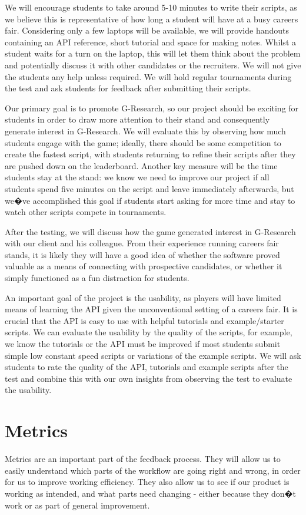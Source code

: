 We will encourage students to take around 5-10 minutes to write their scripts, as we believe this is representative of how long a student will have at a busy careers fair. Considering only a few laptops will be available, we will provide handouts containing an API reference, short tutorial and space for making notes. Whilst a student waits for a turn on the laptop, this will let them think about the problem and potentially discuss it with other candidates or the recruiters. We will not give the students any help unless required. We will hold regular tournaments during the test and ask students for feedback after submitting their scripts. 

Our primary goal is to promote G-Research, so our project should be exciting for students in order to draw more attention to their stand and consequently generate interest in G-Research. We will evaluate this by observing how much students engage with the game; ideally, there should be some competition to create the fastest script, with students returning to refine their scripts after they are pushed down on the leaderboard. Another key measure will be the time students stay at the stand: we know we need to improve our project if all students spend five minutes on the script and leave immediately afterwards, but we�ve accomplished this goal if students start asking for more time and stay to watch other scripts compete in tournaments.

After the testing, we will discuss how the game generated interest in G-Research with our client and his colleague. From their experience running careers fair stands, it is likely they will have a good idea of whether the software proved valuable as a means of connecting with prospective candidates, or whether it simply functioned as a fun distraction for students. 

An important goal of the project is the usability, as players will have limited means of learning the API given the unconventional setting of a careers fair. It is crucial that the API is easy to use with helpful tutorials and example/starter scripts. We can evaluate the usability by the quality of the scripts, for example, we know the tutorials or the API must be improved if most students submit simple low constant speed scripts or variations of the example scripts. We will ask students to rate the quality of the API, tutorials and example scripts after the test and combine this with our own insights from observing the test to evaluate the usability.

\section{Metrics}
Metrics are an important part of the feedback process. They will allow us to easily understand which parts of the workflow are going right and wrong, in order for us to improve working efficiency. They also allow us to see if our product is working as intended, and what parts need changing - either because they don�t work or as part of general improvement.
